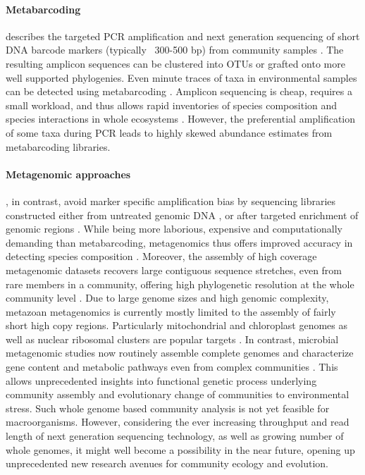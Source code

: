 \documentclass[12pt]{article}
\begin{document}
\paragraph{Metabarcoding} describes the targeted PCR amplification and
next generation sequencing of short DNA barcode markers (typically
~300-500 bp) from community samples \citep{ji2013}. The
resulting amplicon sequences can be clustered into OTUs or grafted
onto more well supported phylogenies. Even minute traces of taxa in
environmental samples can be detected using metabarcoding
\citep{bohmann2014}.  Amplicon sequencing is cheap, requires a small
workload, and thus allows rapid inventories of species composition and
species interactions in whole ecosystems \citep{gibson2014,
  leray2015}. However, the preferential amplification of some taxa
during PCR leads to highly skewed abundance estimates \citep{elbrecht2015} from metabarcoding libraries.

\paragraph{Metagenomic approaches}, in contrast, avoid marker specific
amplification bias by sequencing libraries constructed either from
untreated genomic DNA \citep{dodsworth2015, linard2015}, or
after targeted enrichment of genomic regions \citep{liu2016}. While
being more laborious, expensive and computationally demanding than
metabarcoding, metagenomics thus offers improved accuracy in detecting
species composition \citep{zhou2013}. Moreover, the
assembly of high coverage metagenomic datasets recovers large
contiguous sequence stretches, even from rare members in a community,
offering high phylogenetic resolution at the whole community level
\citep{coissac2016}. Due to large genome sizes and high genomic
complexity, metazoan metagenomics is currently mostly limited to the
assembly of fairly short high copy regions. Particularly mitochondrial
and chloroplast genomes as well as nuclear ribosomal clusters are
popular targets \citep{dodsworth2015, coissac2016}. In contrast,
microbial metagenomic studies now routinely assemble complete genomes
and characterize gene content and metabolic pathways even from complex
communities \citep{nielsen2014}. This allows unprecedented insights
into functional genetic process underlying community assembly and
evolutionary change of communities to environmental stress.  Such
whole genome based community analysis is not yet feasible for
macroorganisms. However, considering the ever increasing throughput
and read length of next generation sequencing technology, as well as
growing number of whole genomes, it might well become a possibility in
the near future, opening up unprecedented new research avenues for
community ecology and evolution.
\end{document}
